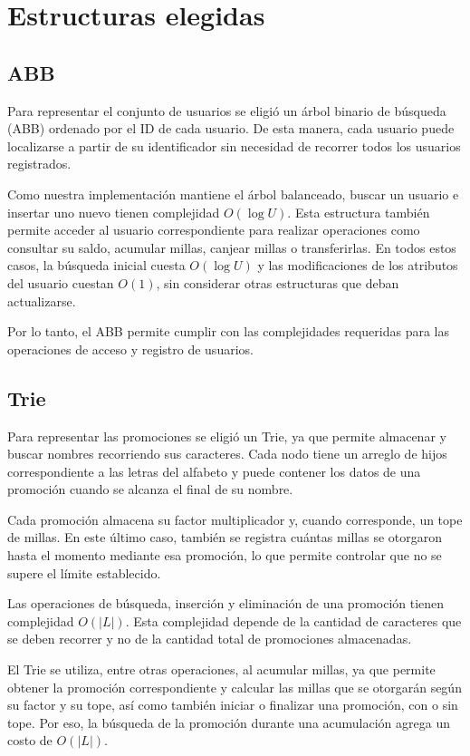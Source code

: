 \documentclass[12pt,a4paper]{article}
\begin{document}
\section{Estructuras elegidas}

\subsection{ABB}

Para representar el conjunto de usuarios se eligió un árbol binario de búsqueda (ABB) ordenado por el ID de cada usuario. De esta manera, cada usuario puede localizarse a partir de su identificador sin necesidad de recorrer todos los usuarios registrados.

Como nuestra implementación mantiene el árbol balanceado, buscar un usuario e insertar uno nuevo tienen complejidad $O(\log U)$. Esta estructura también permite acceder al usuario correspondiente para realizar operaciones como consultar su saldo, acumular millas, canjear millas o transferirlas. En todos estos casos, la búsqueda inicial cuesta $O(\log U)$ y las modificaciones de los atributos del usuario cuestan $O(1)$, sin considerar otras estructuras que deban actualizarse.

Por lo tanto, el ABB permite cumplir con las complejidades requeridas para las operaciones de acceso y registro de usuarios.

\subsection{Trie}

Para representar las promociones se eligió un Trie, ya que permite almacenar y buscar nombres recorriendo sus caracteres. Cada nodo tiene un arreglo de hijos correspondiente a las letras del alfabeto y puede contener los datos de una promoción cuando se alcanza el final de su nombre.

Cada promoción almacena su factor multiplicador y, cuando corresponde, un tope de millas. En este último caso, también se registra cuántas millas se otorgaron hasta el momento mediante esa promoción, lo que permite controlar que no se supere el límite establecido.

Las operaciones de búsqueda, inserción y eliminación de una promoción tienen complejidad $O(|L|)$. Esta complejidad depende de la cantidad de caracteres que se deben recorrer y no de la cantidad total de promociones almacenadas.

El Trie se utiliza, entre otras operaciones, al acumular millas, ya que permite obtener la promoción correspondiente y calcular las millas que se otorgarán según su factor y su tope, así como también iniciar o finalizar una promoción, con o sin tope. Por eso, la búsqueda de la promoción durante una acumulación agrega un costo de $O(|L|)$.
\end{document}
